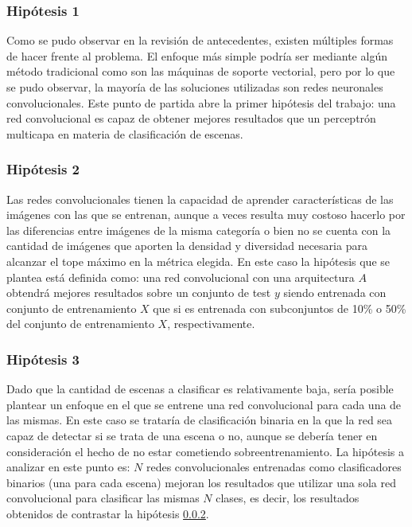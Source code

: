 \subsubsection{Hipótesis 1} \label{sssec:hipotesis1}
Como se pudo observar en la revisión de antecedentes, existen múltiples formas de hacer frente al problema. El enfoque más simple podría ser mediante algún método tradicional como son las máquinas de soporte vectorial, pero por lo que se pudo observar, la mayoría de las soluciones utilizadas son redes neuronales convolucionales. Este punto de partida abre la primer hipótesis del trabajo: una red convolucional es capaz de obtener mejores resultados que un perceptrón multicapa en materia de clasificación de escenas.

\subsubsection{Hipótesis 2} \label{sssec:hipotesis2}
Las redes convolucionales tienen la capacidad de aprender características de las imágenes con las que se entrenan, aunque a veces resulta muy costoso hacerlo por las diferencias entre imágenes de la misma categoría o bien no se cuenta con la cantidad de imágenes que aporten la densidad y diversidad necesaria para alcanzar el tope máximo en la métrica elegida. 
En este caso la hipótesis que se plantea está definida como: una red convolucional con una arquitectura \(A\) obtendrá mejores resultados sobre un conjunto de test \(y\) siendo entrenada con conjunto de entrenamiento \(X\) que si es entrenada con subconjuntos de 10\% o 50\% del conjunto de entrenamiento \(X\), respectivamente.

\subsubsection{Hipótesis 3} \label{sssec:hipotesis3}
Dado que la cantidad de escenas a clasificar es relativamente baja, sería posible plantear un enfoque en el que se entrene una red convolucional para cada una de las mismas. En este caso se trataría de clasificación binaria en la que la red sea capaz de detectar si se trata de una escena o no, aunque se debería tener en consideración el hecho de no estar cometiendo sobreentrenamiento. La hipótesis a analizar en este punto es: \(N\) redes convolucionales entrenadas como clasificadores binarios (una para cada escena) mejoran los resultados que utilizar una sola red convolucional para clasificar las mismas \(N\) clases, es decir, los resultados obtenidos de contrastar la hipótesis \ref{sssec:hipotesis2}.

